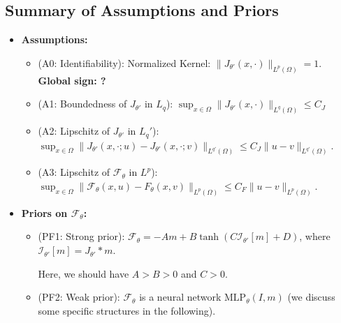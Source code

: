 \documentclass[11pt,a4paper]{article}
\theoremstyle{plain}
\theoremstyle{definition}
\theoremstyle{remark}
\begin{document}
\subsection{Summary of Assumptions and Priors}
\label{subsec:summary_assumptions_priors}

\begin{itemize}
	\item \textbf{Assumptions:}
	      \begin{itemize}
		      \item (A0: Identifiability): Normalized Kernel: $\|J_{\theta'}(x,\cdot)\|_{L^{p}(\Omega)}=1$. \textbf{Global sign: ?}
		      \item (A1: Boundedness of $J_{\theta'}$ in $L_q$): $\sup_{x\in\Omega}\|J_{\theta'}(x,\cdot)\|_{L^{q}(\Omega)}\le C_J$
		      \item (A2: Lipschitz of $J_{\theta'}$ in $L_q'$): $\sup_{x\in\Omega}\|J_{\theta'}(x,\cdot;u)-J_{\theta'}(x,\cdot;v)\|_{L^{q'}(\Omega)}\le C_J\|u-v\|_{L^{q'}(\Omega)}$.
		      \item (A3: Lipschitz of $\mathcal{F}_\theta$ in $L^p$): $\sup_{x\in\Omega}\|\mathcal{F}_\theta(x,u)-F_\theta(x,v)\|_{L^{p}(\Omega)}\le C_F\|u-v\|_{L^{p}(\Omega)}$.
	      \end{itemize}
	\item \textbf{Priors on $\mathcal{F}_\theta$:}
	      \begin{itemize}
		      \item (PF1: Strong prior): $\mathcal{F}_\theta = -A m + B \tanh(C \mathcal{I}_{\theta\prime}[m] + D)$, where $\mathcal{I}_{\theta\prime}[m]=J_{\theta\prime}*m$.

		            Here, we should have $A>B>0$ and $C>0$.
		      \item (PF2: Weak prior): $\mathcal{F}_\theta$ is a neural network $\mathrm{MLP}_\theta(I,m)$ (we discuss some specific structures in the following).
	      \end{itemize}


\end{itemize}
\end{document}
